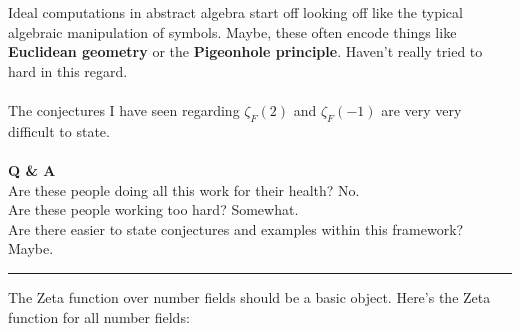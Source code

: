 \documentclass[12pt]{article}
\begin{document}
\newpage

\noindent Ideal computations in abstract algebra start off looking off like the typical algebraic manipulation of symbols.  Maybe, these often encode things like \textbf{Euclidean geometry} or the \textbf{Pigeonhole principle}.  Haven't really tried to hard in this regard.  \\ \\
The conjectures I have seen regarding $\zeta_F(2)$ and $\zeta_F(-1)$ are very very difficult to state. \\ \\
\textbf{Q \& A} \\
Are these people doing all this work for their health?  No. \\
Are these people working too hard?  Somewhat. \\
Are there easier to state conjectures and examples within this framework?  Maybe. \\
\hrule \vspace{6pt}
\noindent The Zeta function over number fields should be a basic object.  Here's the Zeta function for all number fields:
\end{document}
